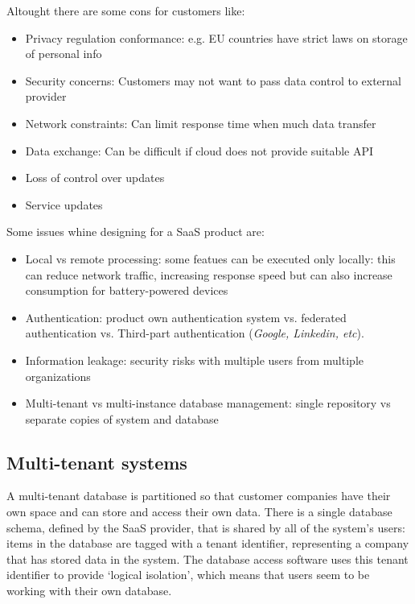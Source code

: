 \documentclass[10pt,a4paper]{report}
\begin{document}
Altought there are some cons for customers like:
\begin{itemize}
	\item Privacy regulation conformance: e.g. EU countries have strict laws on storage of personal info
	\item Security concerns: Customers may not want to pass data control to external provider
	\item Network constraints: Can limit response time when much data transfer
	\item Data exchange: Can be difficult if cloud does not provide suitable API
	\item Loss of control over updates
	\item Service updates
\end{itemize}
Some issues whine designing for a SaaS product are:
\begin{itemize}
	\item Local vs remote processing: some featues can be executed only locally: this can reduce network traffic, increasing response speed but can also increase consumption for battery-powered devices
	\item Authentication: product own authentication system vs. federated authentication vs. Third-part authentication (\textit{Google, Linkedin, etc}).
	\item Information leakage: security risks with multiple users from multiple organizations
	\item Multi-tenant vs multi-instance database management: single repository vs separate copies of system and database
\end{itemize}
\subsection{Multi-tenant systems}
 A multi-tenant database is partitioned so that customer companies have
their own space and can store and access their own data. There is a single database schema, defined by the SaaS provider, that is shared
by all of the system’s users: items in the database are tagged with a tenant identifier, representing a
company that has stored data in the system. The database access software
uses this tenant identifier to provide ‘logical isolation’, which means that users
seem to be working with their own database.
\end{document}
